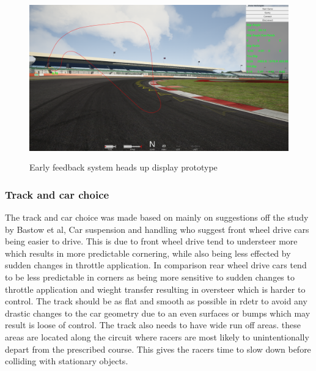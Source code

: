 \begin{figure}[!htb]
	\centering
	\includegraphics[height=7cm]{images/uiPrototype}
	\caption{Early feedback system heads up display prototype}
	\label{fig:uiPrototype}
\end{figure}

\subsubsection{Track and car choice}
The track and car choice was made based on mainly on suggestions off the study by Bastow et al, Car suspension and handling who suggest front wheel drive  cars being easier to drive. This is due to front wheel drive tend to understeer more which results in more predictable cornering, while also being less effected by sudden changes in throttle application. In comparison rear wheel drive cars tend to be less predictable in corners as being more sensitive to sudden changes to throttle application and wieght transfer resulting in oversteer which is harder to control. The track should be as flat and smooth as possible in rdetr to avoid any drastic changes to the car geometry due to an even surfaces or bumps which may result is loose of control. The track also needs to have wide run off areas. these areas are located along the circuit where racers are most likely to unintentionally depart from the prescribed course. This gives the racers time to slow down before colliding with stationary objects.

